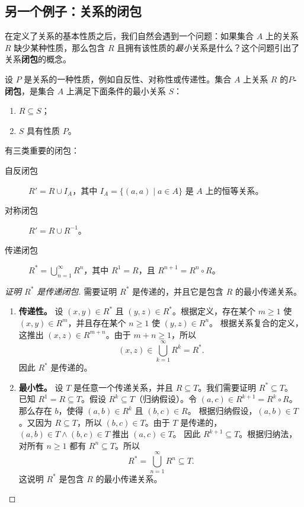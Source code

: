 \subsection{另一个例子：关系的闭包}

在定义了关系的基本性质之后，我们自然会遇到一个问题：如果集合 $A$ 上的关系 $R$ 缺少某种性质，那么包含 $R$ 且拥有该性质的\emph{最小}关系是什么？这个问题引出了关系\textbf{闭包}的概念。

\begin{definition}[闭包]
设 $P$ 是关系的一种性质，例如自反性、对称性或传递性。集合 $A$ 上关系 $R$ 的\textbf{$P$-闭包}，是集合 $A$ 上满足下面条件的最小关系 $S$：
\begin{enumerate}
    \item $R\subseteq S$；
    \item $S$ 具有性质 $P$。
\end{enumerate}
\end{definition}

有三类重要的闭包：
\begin{description}
    \item[自反闭包] $R'=R\cup I_A$，其中 $I_A=\{(a,a)\mid a\in A\}$ 是 $A$ 上的恒等关系。
    \item[对称闭包] $R'=R\cup R^{-1}$。
    \item[传递闭包] $R^*=\bigcup_{n=1}^{\infty}R^n$，其中 $R^1=R$，且 $R^{n+1}=R^n\circ R$。
\end{description}

\begin{proof}[证明 $R^*$ 是传递闭包]
需要证明 $R^*$ 是传递的，并且它是包含 $R$ 的最小传递关系。
\begin{enumerate}
    \item \textbf{传递性。}
    设 $(x,y)\in R^*$ 且 $(y,z)\in R^*$。根据定义，存在某个 $m\ge1$ 使 $(x,y)\in R^m$，并且存在某个 $n\ge1$ 使 $(y,z)\in R^n$。
    根据关系复合的定义，这推出 $(x,z)\in R^{m+n}$。由于 $m+n\ge1$，所以
    \[
    (x,z)\in\bigcup_{k=1}^{\infty}R^k=R^*.
    \]
    因此 $R^*$ 是传递的。

    \item \textbf{最小性。}
    设 $T$ 是任意一个传递关系，并且 $R\subseteq T$。我们需要证明 $R^*\subseteq T$。
    已知 $R^1=R\subseteq T$。假设 $R^k\subseteq T$（归纳假设）。令 $(a,c)\in R^{k+1}=R^k\circ R$。那么存在 $b$，使得 $(a,b)\in R^k$ 且 $(b,c)\in R$。
    根据归纳假设，$(a,b)\in T$。又因为 $R\subseteq T$，所以 $(b,c)\in T$。由于 $T$ 是传递的，$(a,b)\in T\wedge(b,c)\in T$ 推出 $(a,c)\in T$。
    因此 $R^{k+1}\subseteq T$。根据归纳法，对所有 $n\ge1$ 都有 $R^n\subseteq T$。所以
    \[
    R^*=\bigcup_{n=1}^{\infty}R^n\subseteq T.
    \]
    这说明 $R^*$ 是包含 $R$ 的最小传递关系。
\end{enumerate}
\end{proof}

